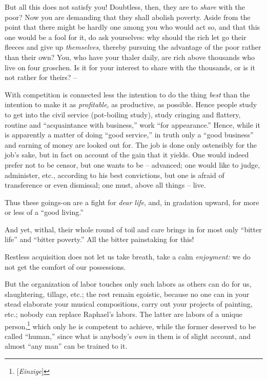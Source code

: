 But all this does not satisfy you! Doubtless, then, they are to \textit{share} 
with the poor? Now you are demanding that they shall abolish poverty. Aside 
from the point that there might be hardly one among you who would act so, and 
that this one would be a fool for it, do ask yourselves: why should the rich 
let go their fleeces and give up \textit{themselves}, thereby pursuing the 
advantage of the poor rather than their own? You, who have your thaler daily, 
are rich above thousands who live on four groschen. Is it for your interest to 
share with the thousands, or is it not rather for theirs? --

With competition is connected less the intention to do the thing \textit{best} 
than the intention to make it as \textit{profitable}, as productive, as 
possible. Hence people study to get into the civil service (pot-boiling 
study), study cringing and flattery, routine and ``acquaintance with 
business,'' work ``for appearance.'' Hence, while it is apparently a matter 
of doing ``good service,'' in truth only a ``good business'' and earning 
of money are looked out for. The job is done only ostensibly for the job's 
sake, but in fact on account of the gain that it yields. One would indeed 
prefer not to be censor, but one wants to be -- advanced; one would like to 
judge, administer, etc., according to his best convictions, but one is afraid 
of transference or even dismissal; one must, above all things -- live.

Thus these goings-on are a fight for \textit{dear life}, and, in gradation 
upward, for more or less of a ``good living.''

And yet, withal, their whole round of toil and care brings in for most only 
``bitter life'' and ``bitter poverty.'' All the bitter painstaking for 
this!

Restless acquisition does not let us take breath, take a calm 
\textit{enjoyment:} we do not get the comfort of our possessions.

But the organization of labor touches only such labors as others can do for 
us, slaughtering, tillage, etc.; the rest remain egoistic, because no one can 
in your stead elaborate your musical compositions, carry out your projects of 
painting, etc.; nobody can replace Raphael's labors. The latter are labors of 
a unique person,\footnote{[\textit{Einzige}]} which only he is competent to 
achieve, while the former deserved to be called ``human,'' since what is 
anybody's \textit{own} in them is of slight account, and almost ``any man'' 
can be trained to it.


